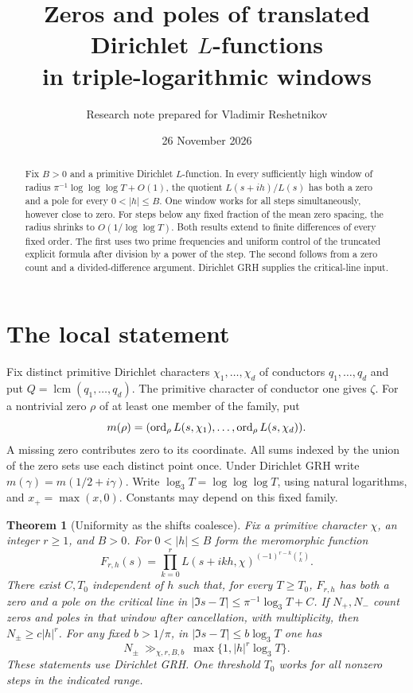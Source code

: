 \documentclass[11pt]{article}
\title{\vspace{-1.2em}\color{ink}\bfseries Zeros and poles of translated Dirichlet $L$-functions\\ in triple-logarithmic windows}
\author{Research note prepared for Vladimir Reshetnikov}
\date{26 November 2026}
\newtheorem{theorem}{Theorem}
\newcommand{\lthree}{\log_3 T}
\begin{document}
\maketitle
\begin{abstract}
Fix $B>0$ and a primitive Dirichlet $L$-function. In every sufficiently
high window of radius $\pi^{-1}\log\log\log T+O(1)$, the quotient
$L(s+ih)/L(s)$ has both a zero and a pole for every $0<|h|\le B$.
One window works for all steps simultaneously, however close to zero.
For steps below any fixed fraction of the mean zero spacing, the radius
shrinks to $O(1/\log\log T)$. Both results extend to finite differences
of every fixed order. The first uses two prime frequencies and uniform
control of the truncated explicit formula after division by a power of
the step. The second follows from a zero count and a divided-difference
argument. Dirichlet GRH supplies the critical-line input.
\end{abstract}

\section{The local statement}
Fix distinct primitive Dirichlet characters $\chi_1,\ldots,\chi_d$ of
conductors $q_1,\ldots,q_d$ and put $Q=\operatorname{lcm}(q_1,\ldots,q_d)$. The primitive character of conductor one gives
$\zeta$. For a nontrivial zero $\rho$ of at least one member of the family, put
\[
 m(\rho)=(\operatorname{ord}_\rho L(s,\chi_1),\ldots,\operatorname{ord}_\rho L(s,\chi_d)).
\]
A missing zero contributes zero to its coordinate. All sums indexed by the
union of the zero sets use each distinct point once. Under Dirichlet GRH write
$m(\gamma)=m(1/2+i\gamma)$. Write $\lthree=\log\log\log T$, using natural
logarithms, and $x_+=\max(x,0)$. Constants may depend on this fixed family.

\begin{theorem}[Uniformity as the shifts coalesce]\label{th:diff}
Fix a primitive character $\chi$, an integer $r\ge1$, and $B>0$.
For $0<|h|\le B$ form the meromorphic function
\[
 F_{r,h}(s)=\prod_{k=0}^r L(s+ikh,\chi)^{(-1)^{r-k}\binom rk}.
\]
There exist $C,T_0$ independent of $h$ such that, for every $T\ge T_0$,
$F_{r,h}$ has both a zero and a pole on the critical line in
$|\Im s-T|\le\pi^{-1}\lthree+C$. If $N_+,N_-$ count zeros and poles
in that window after cancellation, with multiplicity, then
$N_\pm\ge c|h|^r$. For any fixed $b>1/\pi$, in
$|\Im s-T|\le b\lthree$ one has
\[
 N_\pm\ \gg_{\chi,r,B,b}\ \max\{1,|h|^r\lthree\}.
\]
These statements use Dirichlet GRH. One threshold $T_0$ works for
all nonzero steps in the indicated range.
\end{theorem}
\end{document}
